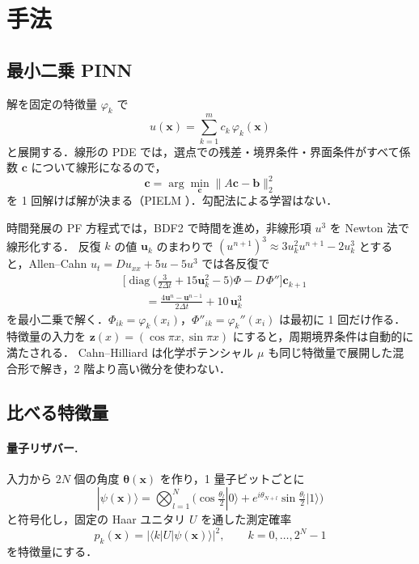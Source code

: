 \documentclass[uplatex,dvipdfmx,a4paper,10pt,twocolumn]{jsarticle}
\theoremstyle{definition}
\begin{document}
\section{手法}
\subsection{最小二乗 PINN}
解を固定の特徴量 $\varphi_k$ で
\begin{equation}
  u(\bm x)=\sum_{k=1}^{m}c_k\,\varphi_k(\bm x)
\end{equation}
と展開する．線形の PDE では，選点での残差・境界条件・界面条件がすべて係数 $\bm c$ について線形になるので，
\begin{equation}
  \bm c=\arg\min_{\bm c}\|A\bm c-\bm b\|_2^2
\end{equation}
を 1 回解けば解が決まる（PIELM \cite{pielm}）．勾配法による学習はない．

時間発展の PF 方程式では，BDF2 で時間を進め，非線形項 $u^3$ を Newton 法で線形化する．
反復 $k$ の値 $\bm u_k$ のまわりで $(u^{n+1})^3\approx3u_k^2u^{n+1}-2u_k^3$ とすると，Allen--Cahn
$u_t=Du_{xx}+5u-5u^3$ では各反復で
\begin{equation}
\begin{aligned}
  &\Big[\operatorname{diag}\big(\tfrac{3}{2\Delta t}+15\bm u_k^2-5\big)\Phi-D\,\Phi''\Big]\bm c_{k+1}\\
  &\qquad=\frac{4\bm u^{n}-\bm u^{n-1}}{2\Delta t}+10\,\bm u_k^3
\end{aligned}
\end{equation}
を最小二乗で解く．$\Phi_{ik}=\varphi_k(x_i)$，$\Phi''_{ik}=\varphi_k''(x_i)$ は最初に 1 回だけ作る．
特徴量の入力を $\bm z(x)=(\cos\pi x,\sin\pi x)$ にすると，周期境界条件は自動的に満たされる．
Cahn--Hilliard は化学ポテンシャル $\mu$ も同じ特徴量で展開した混合形で解き，2 階より高い微分を使わない．

\subsection{比べる特徴量}
\paragraph{量子リザバー.} 入力から $2N$ 個の角度 $\bm\theta(\bm x)$ を作り，1 量子ビットごとに
\begin{equation}
  |\psi(\bm x)\rangle=\bigotimes_{l=1}^{N}\Big(\cos\tfrac{\theta_l}{2}|0\rangle+e^{i\theta_{N+l}}\sin\tfrac{\theta_l}{2}|1\rangle\Big)
\end{equation}
と符号化し，固定の Haar ユニタリ $U$ を通した測定確率
\begin{equation}
  p_k(\bm x)=\big|\langle k|U|\psi(\bm x)\rangle\big|^2,\qquad k=0,\dots,2^N-1
\end{equation}
を特徴量にする．
\end{document}
